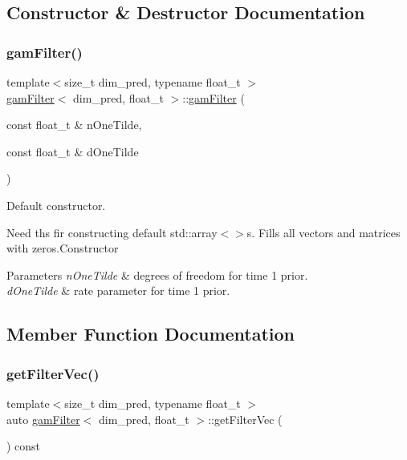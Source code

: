 \subsection{Constructor \& Destructor Documentation}
\mbox{\label{classgamFilter_af412e3430594dafd0779363c1664d5f8}} 
\subsubsection{\texorpdfstring{gam\+Filter()}{gamFilter()}}
{\footnotesize\ttfamily template$<$size\+\_\+t dim\+\_\+pred, typename float\+\_\+t $>$ \\
\hyperlink{classgamFilter}{gam\+Filter}$<$ dim\+\_\+pred, float\+\_\+t $>$\+::\hyperlink{classgamFilter}{gam\+Filter} (\begin{DoxyParamCaption}\item[{const float\+\_\+t \&}]{n\+One\+Tilde,  }\item[{const float\+\_\+t \&}]{d\+One\+Tilde }\end{DoxyParamCaption})}



Default constructor. 

Need ths fir constructing default std\+::array$<$$>$s. Fills all vectors and matrices with zeros.\+Constructor


\begin{DoxyParams}{Parameters}
{\em n\+One\+Tilde} & degrees of freedom for time 1 prior. \\
\hline
{\em d\+One\+Tilde} & rate parameter for time 1 prior. \\
\hline
\end{DoxyParams}


\subsection{Member Function Documentation}
\mbox{\label{classgamFilter_a1e76b015d5319ab1ce188848b525927a}} 
\subsubsection{\texorpdfstring{get\+Filter\+Vec()}{getFilterVec()}}
{\footnotesize\ttfamily template$<$size\+\_\+t dim\+\_\+pred, typename float\+\_\+t $>$ \\
auto \hyperlink{classgamFilter}{gam\+Filter}$<$ dim\+\_\+pred, float\+\_\+t $>$\+::get\+Filter\+Vec (\begin{DoxyParamCaption}{ }\end{DoxyParamCaption}) const}



